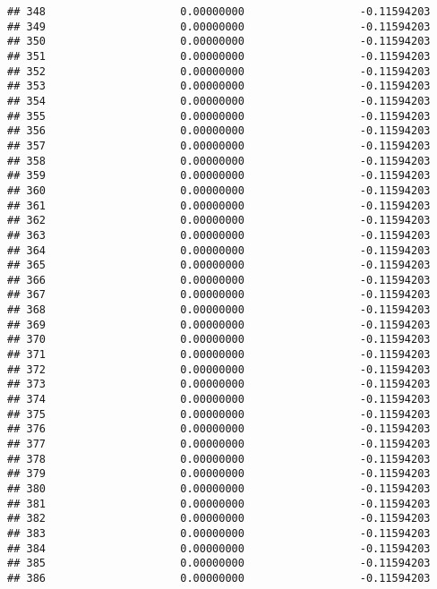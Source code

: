 \documentclass[]{article}
\begin{document}
\begin{verbatim}
## 348                     0.00000000                  -0.11594203
## 349                     0.00000000                  -0.11594203
## 350                     0.00000000                  -0.11594203
## 351                     0.00000000                  -0.11594203
## 352                     0.00000000                  -0.11594203
## 353                     0.00000000                  -0.11594203
## 354                     0.00000000                  -0.11594203
## 355                     0.00000000                  -0.11594203
## 356                     0.00000000                  -0.11594203
## 357                     0.00000000                  -0.11594203
## 358                     0.00000000                  -0.11594203
## 359                     0.00000000                  -0.11594203
## 360                     0.00000000                  -0.11594203
## 361                     0.00000000                  -0.11594203
## 362                     0.00000000                  -0.11594203
## 363                     0.00000000                  -0.11594203
## 364                     0.00000000                  -0.11594203
## 365                     0.00000000                  -0.11594203
## 366                     0.00000000                  -0.11594203
## 367                     0.00000000                  -0.11594203
## 368                     0.00000000                  -0.11594203
## 369                     0.00000000                  -0.11594203
## 370                     0.00000000                  -0.11594203
## 371                     0.00000000                  -0.11594203
## 372                     0.00000000                  -0.11594203
## 373                     0.00000000                  -0.11594203
## 374                     0.00000000                  -0.11594203
## 375                     0.00000000                  -0.11594203
## 376                     0.00000000                  -0.11594203
## 377                     0.00000000                  -0.11594203
## 378                     0.00000000                  -0.11594203
## 379                     0.00000000                  -0.11594203
## 380                     0.00000000                  -0.11594203
## 381                     0.00000000                  -0.11594203
## 382                     0.00000000                  -0.11594203
## 383                     0.00000000                  -0.11594203
## 384                     0.00000000                  -0.11594203
## 385                     0.00000000                  -0.11594203
## 386                     0.00000000                  -0.11594203

\end{verbatim}
\end{document}
